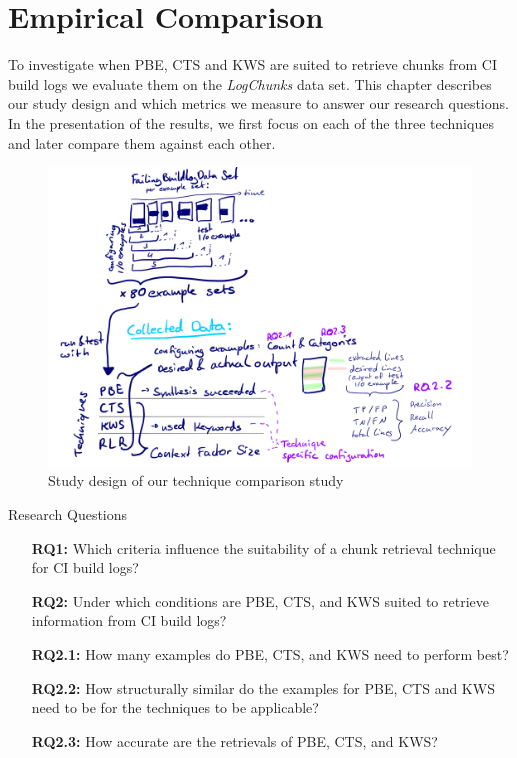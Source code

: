 \documentclass[\myrootdir/main.tex]{subfiles}
\begin{document}
\chapter{Empirical Comparison}
\label{sec:study}
To investigate when PBE, CTS and KWS are suited to retrieve chunks from CI build logs we evaluate them on the \emph{LogChunks} data set.
This chapter describes our study design and which metrics we measure to answer our research questions.
In the presentation of the results, we first focus on each of the three techniques and later compare them against each other.


\begin{figure}[htbp]
	\centering
	\includegraphics[width=\textwidth, clip]{img/study-design.pdf}
	\caption{Study design of our technique comparison study}
	\label{fig:study}
\end{figure}


\begin{simplebox}{Research Questions}
\begin{itemize}
  \item[\textbf{RQ1:}] Which criteria influence the suitability of a chunk retrieval technique for CI build logs?
  \item[\textbf{RQ2:}] Under which conditions are PBE, CTS, and KWS suited to retrieve information from CI build logs?
  \item[\textbf{RQ2.1:}] How many examples do PBE, CTS, and KWS need to perform best?
  \item[\textbf{RQ2.2:}] How structurally similar do the examples for PBE, CTS and KWS need to be for the techniques to be applicable?
  \item[\textbf{RQ2.3:}] How accurate are the retrievals of PBE, CTS, and KWS?
\end{itemize}
\end{simplebox}
\end{document}
